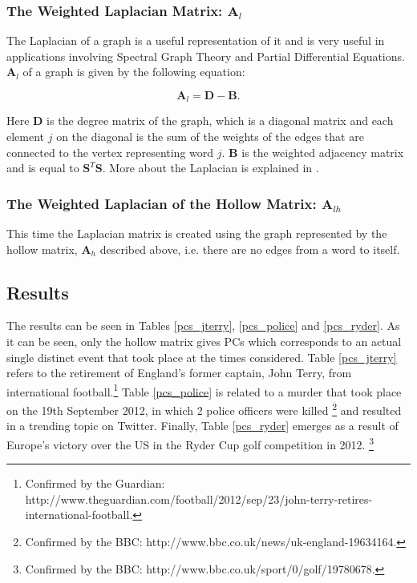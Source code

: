 \documentclass[graybox]{svmult}
\newcommand{\smat}{\mathbf{S}}
\newcommand{\covmat}{\mathbf{A}}
\newcommand{\tp}{^T}
\begin{document}
\subsubsection{The Weighted Laplacian Matrix: $\mathbf{A}_{l}$}

The Laplacian of a graph is a useful representation of it and is very useful in applications involving Spectral Graph Theory and Partial Differential Equations. $\mathbf{A}_{l}$ of a graph is given by the following equation:

\begin{equation}
\mathbf{A}_{l} = \mathbf{D} - \mathbf{B}.
\end{equation}

Here $\mathbf{D}$ is the degree matrix of the graph, which is a diagonal matrix and each element $j$ on the diagonal is the sum of the weights of the edges that are connected to the vertex representing word $j$. $\mathbf{B}$ is the weighted adjacency matrix and is equal to $\smat\tp\smat$. More about the Laplacian is explained in \cite{laplacian_spielman}. 

\subsubsection{The Weighted Laplacian of the Hollow Matrix: $\mathbf{A}_{lh}$}

This time the Laplacian matrix is created using the graph represented by the hollow matrix, $\covmat_h$ described above, i.e. there are no edges from a word to itself.

\subsection{Results}

The results can be seen in Tables \ref{pcs_jterry}, \ref{pcs_police} and \ref{pcs_ryder}. As it can be seen, only the hollow matrix gives PCs which corresponds to an actual single distinct event that took place at the times considered. Table \ref{pcs_jterry} refers to the retirement of England's former captain, John Terry, from international football.\footnote{Confirmed by the Guardian: http://www.theguardian.com/football/2012/sep/23/john-terry-retires-international-football.} Table \ref{pcs_police} is related to a murder that took place on the 19th September 2012, in which 2 police officers were killed \footnote{Confirmed by the BBC: http://www.bbc.co.uk/news/uk-england-19634164.} and resulted in a trending topic on Twitter. Finally, Table \ref{pcs_ryder} emerges as a result of Europe's victory over the US in the Ryder Cup golf competition in 2012. \footnote{Confirmed by the BBC: http://www.bbc.co.uk/sport/0/golf/19780678.}
\end{document}

